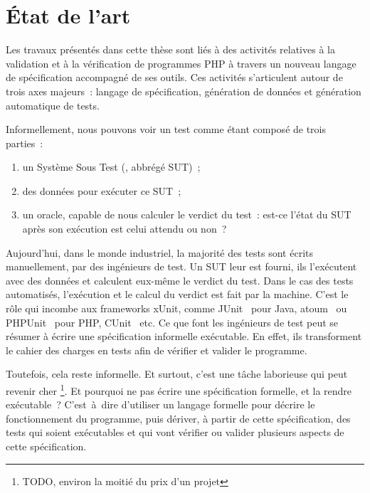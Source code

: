 \chapter{État de l'art}
\label{chapter:state}

\minitoc

Les travaux présentés dans cette thèse sont liés à des activités relatives à la
validation et à la vérification de programmes PHP à travers un nouveau langage
de spécification accompagné de ses outils. Ces activités s'articulent autour de
trois axes majeurs~: langage de spécification, génération de données et
génération automatique de tests.

Informellement, nous pouvons voir un test comme étant composé de trois parties~:

\begin{enumerate}

\item un Système Sous Test (, abbrégé SUT)~;

\item des données pour exécuter ce SUT~;

\item un oracle, capable de nous calculer le verdict du test~: est-ce l'état
du SUT après son exécution est celui attendu ou non~?

\end{enumerate}

Aujourd'hui, dans le monde industriel, la majorité des tests sont écrits
manuellement, par des ingénieurs de test. Un SUT leur est fourni, ils
l'exécutent avec des données et calculent eux-même le verdict du test. Dans le
cas des tests automatisés, l'exécution et le calcul du verdict est fait par la
machine. C'est le rôle qui incombe aux frameworks xUnit, comme
JUnit~\cite{JUnit} pour Java, atoum~\cite{atoum} ou PHPUnit~\cite{PHPUnit} pour
PHP, CUnit~\cite{CUnit} etc. Ce que font les ingénieurs de test peut se résumer
à écrire une spécification informelle exécutable. En effet, ils transforment le
cahier des charges en tests afin de vérifier et valider le programme.

Toutefois, cela reste informelle. Et surtout, c'est une tâche laborieuse qui
peut revenir cher \footnote{TODO, environ la moitié du prix d'un projet}. Et
pourquoi ne pas écrire une spécification formelle, et la rendre exécutable~?
C'est~à~dire d'utiliser un langage formelle pour décrire le fonctionnement du
programme, puis dériver, à partir de cette spécification, des tests qui soient
exécutables et qui vont vérifier ou valider plusieurs aspects de cette
spécification.

